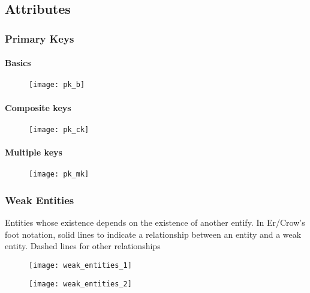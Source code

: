\subsection{Attributes}

\subsubsection{Primary Keys}

\begin{minipage}[t]{0.32\textwidth}
\paragraph{Basics}
\begin{figure}[H]
    \centering
    \texttt{[image: pk\_b]}
\end{figure}
\end{minipage}
\hfill
\begin{minipage}[t]{0.32\textwidth}
\paragraph{Composite keys}
\begin{figure}[H]
    \centering
    \texttt{[image: pk\_ck]}
\end{figure}
\end{minipage}
\hfill
\begin{minipage}[t]{0.32\textwidth}
\paragraph{Multiple keys}
\begin{figure}[H]
    \centering
    \texttt{[image: pk\_mk]}
\end{figure}
\end{minipage}

\subsubsection{Weak Entities}

Entities whose existence depends on the existence of another entify. In Er/Crow's foot notation, solid lines to indicate a relationship between an entity and a weak entity. Dashed lines for other relationships

\begin{minipage}{0.48\textwidth}
\begin{figure}[H]
    \centering
    \texttt{[image: weak\_entities\_1]}
\end{figure}
\end{minipage}
\hfill
\begin{minipage}{0.48\textwidth}
\begin{figure}[H]
    \centering
    \texttt{[image: weak\_entities\_2]}
\end{figure}
\end{minipage}


